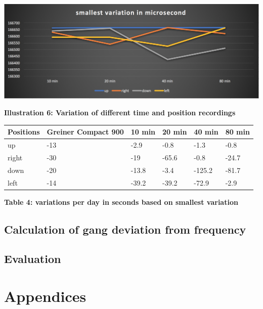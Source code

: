 \documentclass[12pt, a4paper]{report}
\begin{document}
\begin{center}
\includegraphics[scale=0.3]{Images/smallest_variation.png}

{\bf Illustration 6: Variation of different time and position recordings}
\end{center}
\begin{table}[H]
    \begin{tabular}{|l|l|l|l|l|l|}
    \hline
    Positions & Greiner Compact 900 & 10 min & 20 min & 40 min & 80 min \\ \hline
    up        & -13                 & -2.9     & -0.8     & -1.3      & -0.8      \\ \hline
    right     & -30                 & -19      & -65.6    & -0.8      & -24.7      \\ \hline
    down      & -20                 & -13.8    & -3.4     & -125.2    & -81.7      \\ \hline
    left      & -14                 & -39.2	   & -39.2	  & -72.9	  & -2.9      \\ \hline
    \end{tabular}
\end{table}
\begin{center}    
{\bf Table 4: variations per day in seconds based on smallest variation} 
\end{center}

\section{Calculation of gang deviation from frequency}

\section{Evaluation}


\pagebreak

\chapter{Appendices}
\end{document}
